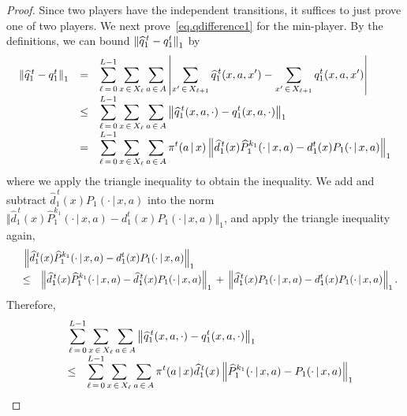 \documentclass[12pt, final]{l4dc2023}
\begin{document}
\begin{proof}
	Since two players have the independent transitions, it suffices to just prove one of two players. We next prove~\eqref{eq.qdifference1} for the min-player. 
	By the definitions, we can bound $\left\|{\widehat q_1^{\,t} - q_1^t}\right\|_1$ by
	\begin{equation}\label{eq.qdifference_xa}
	\begin{array}{rcl}
	\left\|{\widehat q_1^{\,t} - q_1^t}\right\|_1	&=&\displaystyle \sum_{\ell\,=\,0}^{L-1}\sum_{x\,\in\,X_\ell}\sum_{a\,\in\,A}\left| \sum_{x'\,\in\,X_{\ell+1}}  \widehat q_1^{\,t} (x,a,x')- \sum_{x'\,\in\,X_{\ell+1}}  q_1^t (x,a,x')\right|
	\\[0.2cm]
	&\leq&\displaystyle \sum_{\ell\,=\,0}^{L-1}\sum_{x\,\in\,X_\ell}\sum_{a\,\in\,A}\left\|{ \widehat q_1^{\,t} (x,a,\cdot)- q_1^t (x,a,\cdot)}\right\|_1
	\\[0.2cm]
	&=&\displaystyle \sum_{\ell\,=\,0}^{L-1}\sum_{x\,\in\,X_\ell}\sum_{a\,\in\,A} \pi^t(a\,\vert\,x)  \left\|{ \widehat d_1^{\,t} (x)\widehat P_1^{k_1}(\cdot\,\vert\,x,a)- d_1^t(x) P_1(\cdot\,\vert\,x,a) }\right\|_1
	\end{array}
	\end{equation}
	where we apply the triangle inequality to obtain the inequality. We add and subtract $\hat d_1^{\,t} (x)P_1(\cdot\,\vert\,x,a)$ into the norm $ \Vert{ \hat d_1^{\,t} (x)\hat P_1^{k_1}(\cdot\,\vert\,x,a)- d_1^t(x) P_1(\cdot\,\vert\,x,a) }\Vert_1$, and apply the triangle inequality again,
	\[
	\begin{array}{rcl}
	&&  \!\!\!\! \!\!\!\! \!\!
	\displaystyle
	\norm{ \hat d_1^{\,t} (x)\hat P_1^{k_1}(\cdot\,\vert\,x,a)  -  d_1^t(x) P_1(\cdot\,\vert\,x,a) }_1
	\\[0.2cm]
	&\leq&\displaystyle \norm{ \hat d_1^{\,t} (x)\hat P_1^{k_1}(\cdot\,\vert\,x,a)- \hat d_1^{\,t} (x) P_1(\cdot\,\vert\,x,a) }_1
	\,+\, \norm{ \hat d_1^{\,t} (x) P_1(\cdot\,\vert\,x,a)- d_1^t(x) P_1(\cdot\,\vert\,x,a) }_1.
	\end{array}
	\]
	Therefore,
	\begin{equation}\label{eq.qdifference}
	\begin{array}{rcl}
	&& \!\!\!\! \!\!\!\! \!\!
	\displaystyle
	\sum_{\ell\,=\,0}^{L-1}\sum_{x\,\in\,X_\ell}\sum_{a\,\in\,A}\norm{ \hat q_1^{\,t} (x,a,\cdot)- q_1^t (x,a,\cdot)}_1
	\\[0.2cm]
	&\leq&\displaystyle \sum_{\ell\,=\,0}^{L-1}\sum_{x\,\in\,X_\ell}\sum_{a\,\in\,A} \pi^t(a\,\vert\,x) \hat d_1^{\,t} (x) \norm{ \hat P_1^{k_1}(\cdot\,\vert\,x,a)-  P_1(\cdot\,\vert\,x,a) }_1

\end{array}
\end{equation}
\end{proof}
\end{document}
